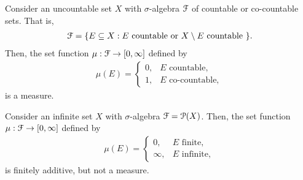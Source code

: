 \documentclass[a4paper,english,12pt]{article}
\begin{document}
\begin{exmp} Consider an uncountable set $X$ with $\sigma$-algebra $\mathcal{F}$ of countable or co-countable sets. That is,
\begin{align*}
\mathcal{F} = \{ E \subseteq X: E \text{ countable or } X \setminus E \text{ countable } \}. 
\end{align*}
Then, the set function $\mu: \mathcal{F} \to [0, \infty]$ defined by 
\begin{align*}
\mu(E) = \begin{cases}0, & E \text{ countable},\\1, & E \text{ co-countable},\end{cases}
\end{align*}
is a measure.
\end{exmp}
\begin{exmp} Consider an infinite set $X$ with $\sigma$-algebra $\mathcal{F} = \mathcal{P}(X)$. Then, the set function $\mu: \mathcal{F} \to [0, \infty]$ defined by 
\begin{align*}
\mu(E) = \begin{cases}0, & E \text{ finite},\\ \infty, & E \text{ infinite},\end{cases}
\end{align*}
is finitely additive, but not a measure.
\end{exmp}
\end{document}
